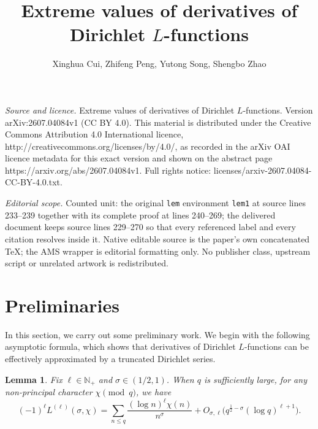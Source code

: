 \documentclass[10pt,a4paper]{amsart}
\newtheorem{lem}[thm]{Lemma}
\numberwithin{equation}{section}
\newcommand{\bg}{\big}
\newcommand{\mbn}{\mathbb{N}}
\begin{document}
\title[Extreme values of derivatives of Dirichlet L-functions]{Extreme values of derivatives of Dirichlet $L$-functions}
\author{Xinghua Cui, Zhifeng Peng, Yutong Song, Shengbo Zhao}
\date{}
\maketitle
\noindent\emph{Source and licence.} Extreme values of derivatives of Dirichlet $L$-functions. Version arXiv:2607.04084v1 (CC BY 4.0). This material is distributed under the Creative Commons Attribution 4.0 International licence, http://creativecommons.org/licenses/by/4.0/, as recorded in the arXiv OAI licence metadata for this exact version and shown on the abstract page https://arxiv.org/abs/2607.04084v1. Full rights notice: licenses/arxiv-2607.04084-CC-BY-4.0.txt.\par\smallskip
\noindent\textit{Editorial scope.} Counted unit: the original \texttt{lem} environment \texttt{lem1} at source lines 233--239 together with its complete proof at lines 240--269; the delivered document keeps source lines 229--270 so that every referenced label and every citation resolves inside it. Native editable source is the paper's own concatenated TeX; the AMS wrapper is editorial formatting only. No publisher class, upstream script or unrelated artwork is redistributed.
\section{Preliminaries}
\label{sec-pre}
In this section, we carry out some preliminary work. We begin with the following asymptotic formula, which shows that derivatives of Dirichlet \(L\)-functions can be effectively approximated by a truncated Dirichlet series.


\begin{lem}
\label{lem1}
    Fix \(\ell \in \mbn_+\) and \(\sigma \in (1/2,1)\). When \(q\) is sufficiently large, for any non-principal character \(\chi\pmod {q}\), we have
    \[
    (-1)^\ell  L^{(\ell)}(\sigma,\chi) = \sum_{n \le q}\frac{(\log n )^\ell \chi(n)}{n^\sigma} + O_{\sigma,\ell} \bg( q^{\frac{1}{2}-\sigma}(\log q)^{\ell+1}\bg).
    \]
\end{lem}
\end{document}
